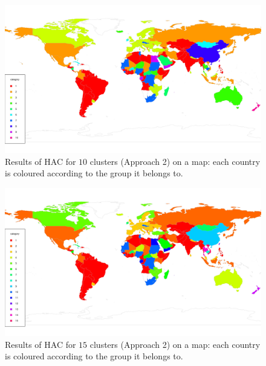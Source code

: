 \documentclass[a4paper,12pt]{article}
\numberwithin{equation}{section}
\begin{document}
\newpage 
\FloatBarrier
\begin{figure}[t!]
\begin{minipage}[t]{0.98\textwidth}
\includegraphics[width=\textwidth]{plots/14days/map_alt_10cl}
\caption{Results of HAC for $10$ clusters (Approach 2) on a map: each country is coloured according to the group it belongs to.}\label{fig:map_alt_10cl}
\end{minipage}
\end{figure}


\begin{figure}[t!]
\begin{minipage}[t]{0.98\textwidth}
\includegraphics[width=\textwidth]{plots/14days/map_alt_15cl}
\caption{Results of HAC for $15$ clusters (Approach 2) on a map: each country is coloured according to the group it belongs to.}\label{fig:map_alt_15cl}
\end{minipage}
\end{figure}
\end{document}
